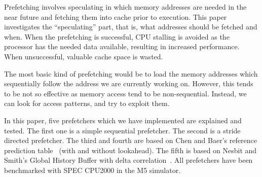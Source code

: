 Prefetching involves speculating in which memory addresses are needed
in the near future and fetching them into cache prior to
execution. This paper investigates the ``speculating'' part, that is,
what addresses should be fetched and when. When the prefetching is
successful, CPU stalling is avoided as the processor has the needed
data available, resulting in increased performance. When unsuccessful,
valuable cache space is wasted.

The most basic kind of prefetching would be to load the memory
addresses which sequentially follow the address we are currently
working on. However, this tends to be not so effective as memory
access tend to be non-sequential. Instead, we can look for access
patterns, and try to exploit them.

In this paper, five prefetchers which we have implemented are
explained and tested. The first one is a simple sequential
prefetcher. The second is a stride directed prefetcher. The third and
fourth are based on Chen and Baer's reference prediction
table~\cite{chen_baer_1995} (with and without lookahead). The fifth is
based on Nesbit and Smith's Global History Buffer with delta
correlation~\cite{nesbit_smith_2005}. All prefetchers have been
benchmarked with SPEC CPU2000 in the M5 simulator.

